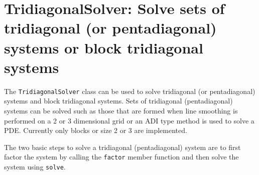 \section{TridiagonalSolver: Solve sets of tridiagonal (or pentadiagonal) systems or block tridiagonal systems}

The {\tt TridiagonalSolver} class can be used to solve tridiagonal (or pentadiagonal) systems and 
block tridiagonal systems. Sets of tridiagonal (pentadiagonal) systems can be solved such as those
that are formed when line smoothing is performed on a 2 or 3 dimensional grid or
an ADI type method is used to solve a PDE. Currently only blocks or size 2 or 3 are
implemented. 

The two basic steps to solve a tridiagonal (pentadiagonal) system are to first factor the system
by calling the {\tt factor} member function and then solve the system using {\tt solve}.

